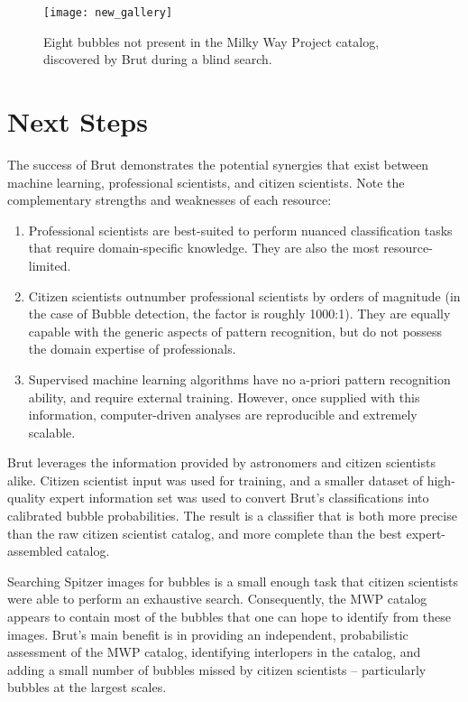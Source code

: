 \documentclass[preprint]{aastex}
\begin{document}
\begin{figure*}
\texttt{[image: new\_gallery]}
\caption{Eight bubbles not present in the Milky Way Project catalog, discovered by Brut during a blind search.}
\label{fig:new_gallery}
\end{figure*}

\section{Next Steps}
\label{sec:next_steps}
The success of Brut demonstrates the potential synergies that exist between machine learning, professional scientists, and citizen scientists. Note the complementary strengths and weaknesses of each resource:

\begin{enumerate}
\item Professional scientists are best-suited to perform nuanced classification tasks that require domain-specific knowledge. They are also the most resource-limited. 
\item Citizen scientists outnumber professional scientists by orders of magnitude (in the case of Bubble detection, the factor is roughly 1000:1). They are equally capable with the generic aspects of pattern recognition, but do not possess the domain expertise of professionals.
\item Supervised machine learning algorithms have no a-priori pattern recognition ability, and require external training. However, once supplied with this information, computer-driven analyses are reproducible and extremely scalable.
\end{enumerate}

Brut leverages the information provided by astronomers and citizen scientists alike. Citizen scientist input was used for training, and a smaller dataset of high-quality expert information set was used to convert Brut's classifications into calibrated bubble probabilities. The result is a classifier that is both more precise than the raw citizen scientist catalog, and more complete than the best expert-assembled catalog.

Searching Spitzer images for bubbles is a small enough task that citizen scientists were able to perform an exhaustive search. Consequently, the MWP catalog appears to contain most of the bubbles that one can hope to identify from these images. Brut's main benefit is in providing an independent, probabilistic assessment of the MWP catalog, identifying interlopers in the catalog, and adding a small number of bubbles missed by citizen scientists -- particularly bubbles at the largest scales.
\end{document}
